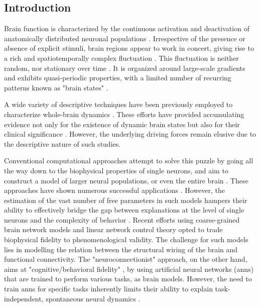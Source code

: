 \documentclass{article}
\begin{document}
\subsection{Introduction}

Brain function is characterized by the continuous activation and deactivation of anatomically distributed neuronal
populations \citep{buzsaki2006rhythms}.
Irrespective of the presence or absence of explicit stimuli, brain regions appear to work in concert, giving rise to a
rich and spatiotemporally complex fluctuation \citep{bassett2017network}.
This fluctuation is neither random, nor stationary over time \citep{liu2013time, zalesky2014time}.
It is organized around large-scale gradients \citep{margulies2016situating, huntenburg2018large} and exhibits quasi-periodic properties, with a limited number of recurring patterns known as "brain states" \citep{greene2023everyone, vidaurre2017brain, liu2013time}.

A wide variety of descriptive techniques have been previously employed to characterize whole-brain dynamics \citep{smith2012temporally, vidaurre2017brain, liu2013time, chen2018human}.
These efforts have provided accumulating evidence not only for the existence of dynamic brain states but also for their clinical
significance \citep{hutchison2013dynamic, barttfeld2015signature, meer2020movie}.
However, the underlying driving forces remain elusive due to the descriptive nature of such studies.

Conventional computational approaches attempt to solve this puzzle by going all the way down to the biophysical properties of single neurons, and aim to construct a model of larger neural populations, or even the entire brain
\citep{breakspear2017dynamic}.
These approaches have shown numerous successful applications \citep{murray2018biophysical, kriegeskorte2018cognitive, heinz2019towards}.
However, the estimation of the vast number of free parameters in such models hampers their ability to effectively bridge the gap between explanations at the level of single neurons and the complexity of behavior \citep{breakspear2017dynamic}.
Recent efforts using coarse-grained brain network models \citep{schirner2022dynamic, schiff1994controlling, papadopoulos2017development, seguin2023brain} and linear network control theory  \citep{chiem2021structure, scheid2021time, gu2015controllability} opted to trade biophysical fidelity to phenomenological validity. The challenge for such models lies in modelling the relation between the structural wiring of the brain and functional connectivity.
The "neuroconnectionist" approach, on the other hand, \citep{doerig2023neuroconnectionist} aims at "cognitive/behavioral fidelity" \citep{kriegeskorte2018cognitive}, by using artificial neural networks (\acrshort{ann}s) that are trained to perform various tasks, as brain models. However, the need to train \acrshort{ann}s for specific tasks inherently limits their ability to explain task-independent, spontaneous neural dynamics \citep{richards2019deep}.
\end{document}
